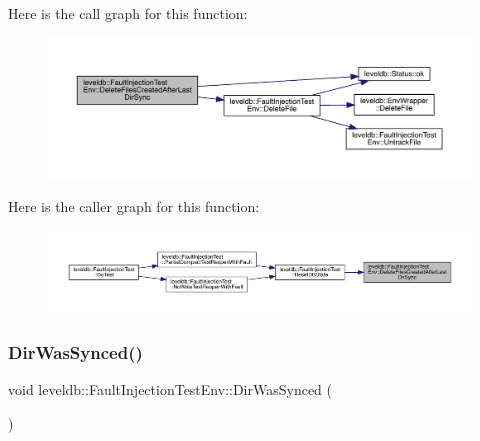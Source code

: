 Here is the call graph for this function\+:
\nopagebreak
\begin{figure}[H]
\begin{center}
\leavevmode
\includegraphics[width=350pt]{classleveldb_1_1_fault_injection_test_env_a0356c344573232057e7afcd738079805_cgraph}
\end{center}
\end{figure}
Here is the caller graph for this function\+:
\nopagebreak
\begin{figure}[H]
\begin{center}
\leavevmode
\includegraphics[width=350pt]{classleveldb_1_1_fault_injection_test_env_a0356c344573232057e7afcd738079805_icgraph}
\end{center}
\end{figure}
\mbox{\label{classleveldb_1_1_fault_injection_test_env_a81cf3925b249591f4247757538005dfc}} 
\subsubsection{\texorpdfstring{DirWasSynced()}{DirWasSynced()}}
{\footnotesize\ttfamily void leveldb\+::\+Fault\+Injection\+Test\+Env\+::\+Dir\+Was\+Synced (\begin{DoxyParamCaption}{ }\end{DoxyParamCaption})}

\mbox{\label{classleveldb_1_1_fault_injection_test_env_a4201d9bce4e169d3a5320c3ecbf05490}} 
